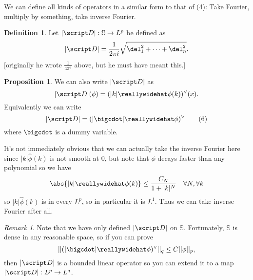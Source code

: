 \documentclass[a5paper]{article}
\theoremstyle{definition}%
\newtheorem{proposition}[theorem]{Proposition}
\newtheorem*{definition*}{Definition}
\numberwithin{exercise}{section}
\theoremstyle{remark}%
\newtheorem*{remark*}{Remark}
\renewcommand{\S}{\mathbb{S}}
\renewcommand{\L}{L}
\begin{document}
We can define all kinds of operators in a similar form to that of (4): Take Fourier, multiply by something, take inverse Fourier. 

\begin{highlight}
\begin{definition*}
Let $|\D|:\S\to L^p$ be defined as
\begin{equation}
|\D|=\frac{1}{2\pi i}\sqrt{\del_1^2+\dots+\del_n^2}.
\end{equation}
[originally he wrote $\frac{1}{4\pi^2}$ above, but he must have meant this.]
\end{definition*}

\begin{proposition}
We can also write $|\D|$ as 
\begin{equation}
|\D|(\phi)= (|k|\hat{\phi}(k))^\vee(x).
\end{equation}
Equivalently we can write 
\begin{equation}
|\D|= (|\bigcdot|\hat{\phi})^\vee\tag{$6$}
\end{equation}
where $\bigcdot$ is a dummy variable. 
\end{proposition}
\end{highlight}
It's not immediately obvious that we can actually take the inverse Fourier here since $|k|\hat{\phi}(k)$ is not smooth at 0, but note that $\phi$ decays faster than any polynomial so we have 
$$\abs{|k|\hat{\phi}(k)}\leq \frac{C_N}{1+|k|^N} \quad \forall N, \forall k$$
so $|k|\hat{\phi}(k)$ is in every $L^p$, so in particular it is $L^1$. Thus we can take inverse Fourier after all. 

\begin{highlight}
\begin{remark*}
Note that we have only defined $|\D|$ on $\S$. Fortunately, $\S$ is dense in any reasonable space, so if you can prove 
$$\norm{(|\bigcdot|\hat{\phi})^\vee}_q\leq C \norm{\phi}_p,$$
then $|\D|$ is a bounded linear operator so you can extend it to a map $|\D|:L^p\to\L^q$. 
\end{remark*}
\end{highlight}
\end{document}
